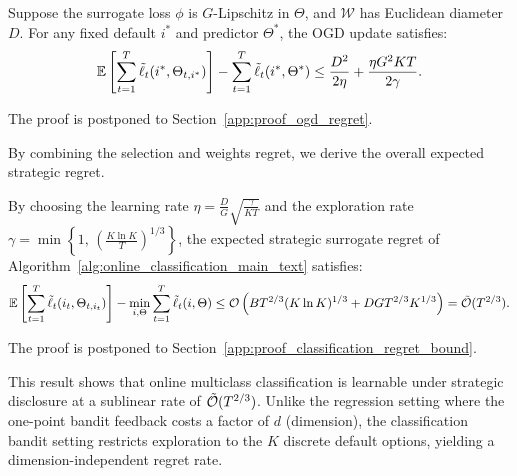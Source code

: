\begin{lemma}
\label{lem:ogd_regret}
Suppose the surrogate loss $\phi$ is $G$-Lipschitz in $\Theta$, and $\mathcal{W}$ has Euclidean diameter $D$. For any fixed default $i^*$ and predictor $\Theta^*$, the OGD update satisfies:
\begin{equation}
    \label{eq:ogd_regret}
    \mathbb{E}\left[ \sum_{t=1}^T \tilde{\ell}_t(i^*, \Theta_{t, i^*}) \right] - \sum_{t=1}^T \tilde{\ell}_t(i^*, \Theta^*) \le \frac{D^2}{2\eta} + \frac{\eta G^2 K T}{2 \gamma}.
\end{equation}
\end{lemma}
The proof is postponed to Section~\ref{app:proof_ogd_regret}.

By combining the selection and weights regret, we derive the overall expected strategic regret.
\begin{theorem}
\label{thm:classification_regret_bound}
By choosing the learning rate $\eta = \frac{D}{G}\sqrt{\frac{\gamma}{K T}}$ and the exploration rate $\gamma = \min\left\{ 1, \, \left(\frac{K \ln K}{T}\right)^{1/3} \right\}$, the expected strategic surrogate regret of Algorithm~\ref{alg:online_classification_main_text} satisfies:
\begin{equation}
    \label{eq:classification_regret_bound}
    \mathbb{E}\left[ \sum_{t=1}^T \tilde{\ell}_t(i_t, \Theta_{t, i_t}) \right] - \min_{i, \Theta} \sum_{t=1}^T \tilde{\ell}_t(i, \Theta) \le \mathcal{O}\left( B T^{2/3} (K \ln K)^{1/3} + D G T^{2/3} K^{1/3} \right) = \tilde{\mathcal{O}}(T^{2/3}).
\end{equation}
\end{theorem}
The proof is postponed to Section~\ref{app:proof_classification_regret_bound}.

\begin{remark}
This result shows that online multiclass classification is learnable under strategic disclosure at a sublinear rate of $\tilde{\mathcal{O}}(T^{2/3})$. Unlike the regression setting where the one-point bandit feedback costs a factor of $d$ (dimension), the classification bandit setting restricts exploration to the $K$ discrete default options, yielding a dimension-independent regret rate.
\end{remark}
